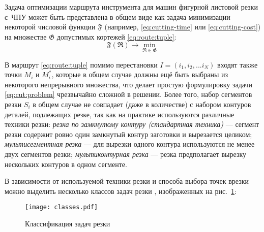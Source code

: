 Задача оптимизации маршрута инструмента для машин фигурной листовой резки с~ЧПУ
может быть представлена в общем виде
как задача минимизации некоторой числовой функции
$\mathfrak F$
(например, \eqref{eq:cutting-time} или \eqref{eq:cutting-cost})
на множестве
$\mathfrak G$ допустимых кортежей
\eqref{eq:route:tuple}:
\begin{equation}
  \mathfrak F(\mathfrak R) \to \min_{\mathfrak R \in \mathfrak G}
  \label{eq:cut:problem}
\end{equation}

В маршрут \eqref{eq:route:tuple} помимо перестановки
$I = (i_1, i_2, ... i_N)$
входят также точки $M_i$ и $M_i^*$,
которые в общем случае должны ещё быть выбраны
из некоторого непрерывного множества,
что делает простую формулировку задачи \eqref{eq:cut:problem}
чрезвычайно сложной в решении.
Более того,
набор сегментов резки $S_i$
в общем случае не совпадает
(даже в количестве)
с набором контуров деталей,
подлежащих резке,
так как на практике используются различные техники резки:
  {\it резка по замкнутому контуру (стандартная техника)} ---
  сегмент резки содержит
  ровно один замкнутый контур заготовки
  и вырезается целиком;
  {\it мультисегментная резка} ---
  для вырезки одного контура
  используются не менее двух сегментов резки;
  {\it мультиконтурная резка} ---
  резка предполагает вырезку нескольких
  контуров в одном сегменте.

В зависимости от используемой техники резки и
способа выбора точек врезки можно выделить
несколько классов задач резки
\autocite[]{bi:dewil-review},
изображенных на рис.~\ref{fig:cut-classes}:

\begin{figure}
  \centering
  \texttt{[image: classes.pdf]}
  \caption{Классификация задач резки}
  \label{fig:cut-classes}
\end{figure}

